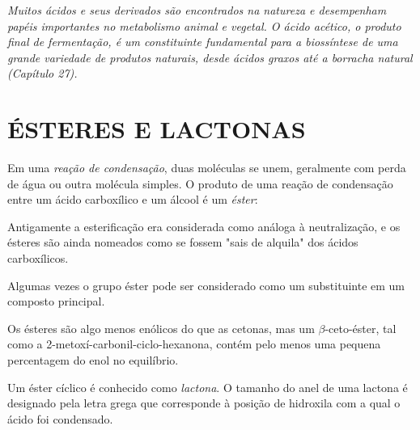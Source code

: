 \emph{Muitos ácidos e seus derivados são encontrados na natureza e desempenham papéis importantes no metabolismo animal e vegetal. O ácido acético, o produto final de fermentação, é um constituinte fundamental para a biossíntese de uma grande variedade de produtos naturais, desde ácidos graxos até a borracha natural (Capítulo 27).}
\par\bigskip

\section{ÉSTERES E LACTONAS}

Em uma \textit{reação de condensação}, duas moléculas se unem, geralmente com perda de água ou outra molécula simples. O produto de uma reação de condensação entre um ácido carboxílico e um álcool é um \textit{éster}:


Antigamente a esterificação era considerada como análoga à neutralização, e os ésteres são ainda nomeados como se fossem "sais de alquila" dos ácidos carboxílicos.

\begin{tightcenter}
    \chemnameinit{}
    \qquad
    \qquad
    \qquad\par\bigskip
    \qquad
    \qquad
\end{tightcenter}

Algumas vezes o grupo éster pode ser considerado como um substituinte em um composto principal.

Os ésteres são algo menos enólicos do que as cetonas, mas um $\beta$-ceto-éster, tal como a 2-metoxí-carbonil-ciclo-hexanona, contém pelo menos uma pequena percentagem do enol no equilíbrio.

Um éster cíclico é conhecido como \textit{lactona}. O tamanho do anel de uma lactona é designado pela letra grega que corresponde à posição de hidroxila com a qual o ácido foi condensado.

\begin{tightcenter}
    \chemnameinit{}
    \qquad\qquad
\end{tightcenter}

